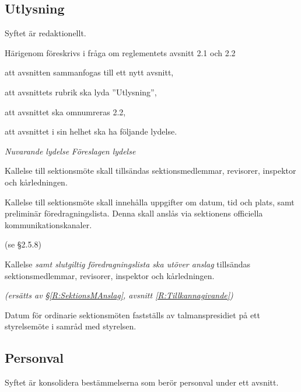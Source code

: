 \documentclass{article}
\newenvironment{lydelse}
    {\begin{paracol}{2}%
        \emph{Nuvarande lydelse}%
        \switchcolumn%
        \emph{Föreslagen lydelse}%
    \end{paracol}%
    \begin{enumerate}[label=\thesubsection.\arabic*]%
    \begin{paracol}{2}%
    }{\end{paracol}\end{enumerate}}
\begin{document}
\subsection{Utlysning}
Syftet är redaktionellt.

Härigenom föreskrivs i fråga om reglementets avsnitt 2.1 och 2.2

\begin{dels}
    \item att avsnitten sammanfogas till ett nytt avsnitt,
    \item att avsnittets rubrik ska lyda ''Utlysning'',
    \item att avsnittet ska omnumreras 2.2,
    \item att avsnittet i sin helhet ska ha följande lydelse.
\end{dels}

\begin{lydelse}
    \setcounter{subsection}{1}
    \setcounter{enumi}{1}
    \item Kallelse till sektionsmöte skall tillsändas sektionsmedlemmar, revisorer, inspektor och kårledningen.
    \setcounter{enumi}{0}
    \item Kallelse till sektionsmöte  skall innehålla uppgifter om datum, tid och plats, samt preliminär föredragningslista. Denna skall anslås via sektionens officiella kommunikationskanaler.
    
    \item[] (se \S 2.5.8)
    
    \setcounter{subsection}{0}
    
    \switchcolumn
    \item Kallelse \emph{samt slutgiltig föredragningslista ska utöver anslag} tillsändas sektionsmedlemmar, revisorer, inspektor och kårledningen.
    \label{R:SektionsMAnslag}
    
    \item[] \emph{(ersätts av \S \ref{R:SektionsMAnslag}, avsnitt \ref{R:Tillkannagivande})}

    \vspace{9ex}
    \item Datum för ordinarie sektionsmöten fastställs av talmanspresidiet på ett styrelsemöte i samråd med styrelsen.
\end{lydelse}

\setcounter{subsection}{2}
\subsection{Personval}
Syftet är konsolidera bestämmelserna som berör personval under ett avsnitt.
\end{document}
